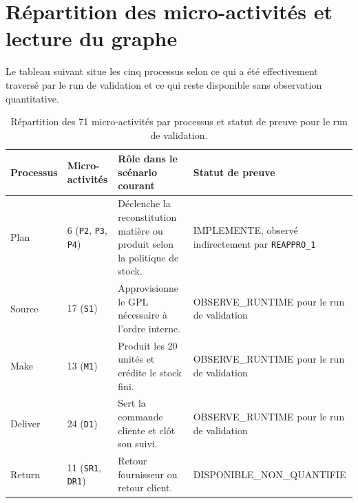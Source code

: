 
\section{Répartition des micro-activités et lecture du graphe}

Le tableau suivant situe les cinq processus selon ce qui a été effectivement traversé par le run de validation et ce qui reste disponible sans observation quantitative.

\begin{table}[H]
  \centering
  \small
  \begin{tabularx}{\textwidth}{L{0.12\textwidth} L{0.09\textwidth} Y L{0.29\textwidth}}
    \toprule
    Processus & Micro-activités & Rôle dans le scénario courant & Statut de preuve \\
    \midrule
    Plan & 6 (\texttt{P2}, \texttt{P3}, \texttt{P4}) & Déclenche la reconstitution matière ou produit selon la politique de stock. & IMPLEMENTE, observé indirectement par \texttt{REAPPRO\_1} \\
    Source & 17 (\texttt{S1}) & Approvisionne le GPL nécessaire à l'ordre interne. & OBSERVE\_\hspace{0pt}RUNTIME pour le run de validation \\
    Make & 13 (\texttt{M1}) & Produit les 20 unités et crédite le stock fini. & OBSERVE\_\hspace{0pt}RUNTIME pour le run de validation \\
    Deliver & 24 (\texttt{D1}) & Sert la commande cliente et clôt son suivi. & OBSERVE\_\hspace{0pt}RUNTIME pour le run de validation \\
    Return & 11 (\texttt{SR1}, \texttt{DR1}) & Retour fournisseur ou retour client. & DISPONIBLE\_\hspace{0pt}NON\_\hspace{0pt}QUANTIFIE \\
    \bottomrule
  \end{tabularx}
  \caption{Répartition des 71 micro-activités par processus et statut de preuve pour le run de validation.}
  \label{tab:repartition-processus}
\end{table}

